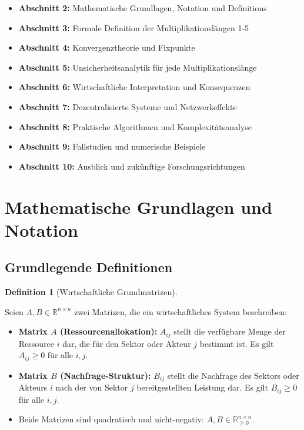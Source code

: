 \documentclass[a4paper,12pt]{article}
\theoremstyle{definition}
\newtheorem{definition}{Definition}
\begin{document}
\begin{itemize}
\item \textbf{Abschnitt 2:} Mathematische Grundlagen, Notation und Definitions
\item \textbf{Abschnitt 3:} Formale Definition der Multiplikationslängen 1-5
\item \textbf{Abschnitt 4:} Konvergenztheorie und Fixpunkte
\item \textbf{Abschnitt 5:} Unsicherheitsanalytik für jede Multiplikationslänge
\item \textbf{Abschnitt 6:} Wirtschaftliche Interpretation und Konsequenzen
\item \textbf{Abschnitt 7:} Dezentralisierte Systeme und Netzwerkeffekte
\item \textbf{Abschnitt 8:} Praktische Algorithmen und Komplexitätsanalyse
\item \textbf{Abschnitt 9:} Fallstudien und numerische Beispiele
\item \textbf{Abschnitt 10:} Ausblick und zukünftige Forschungsrichtungen
\end{itemize}

\section{Mathematische Grundlagen und Notation}

\subsection{Grundlegende Definitionen}

\begin{definition}[Wirtschaftliche Grundmatrizen]
\label{def:grundmatrizen}

Seien $A, B \in \mathbb{R}^{n \times n}$ zwei Matrizen, die ein wirtschaftliches System beschreiben:

\begin{itemize}
\item \textbf{Matrix $A$ (Ressourcenallokation):} $A_{ij}$ stellt die verfügbare Menge der Ressource $i$ dar, die für den Sektor oder Akteur $j$ bestimmt ist. Es gilt $A_{ij} \geq 0$ für alle $i, j$.

\item \textbf{Matrix $B$ (Nachfrage-Struktur):} $B_{ij}$ stellt die Nachfrage des Sektors oder Akteurs $i$ nach der von Sektor $j$ bereitgestellten Leistung dar. Es gilt $B_{ij} \geq 0$ für alle $i, j$.

\item Beide Matrizen sind quadratisch und nicht-negativ: $A, B \in \mathbb{R}_{\geq 0}^{n \times n}$.
\end{itemize}

\end{definition}
\end{document}
